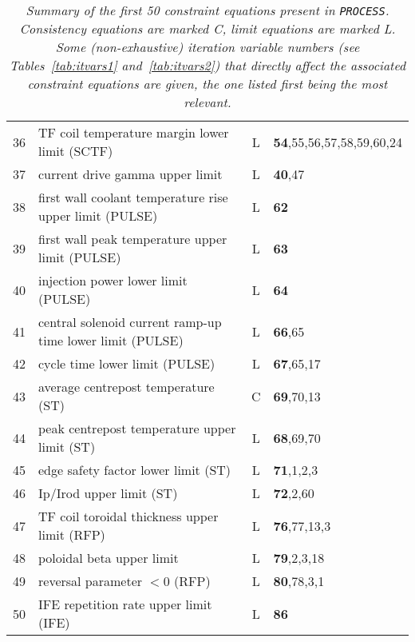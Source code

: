 \documentclass[11pt,a4paper]{report}
\newcommand{\process}{\mbox{\texttt{PROCESS}}}
\begin{document}
\begin{table}[tbph]
\begin{center}
\begin{tabular}{||c|l|c|l||}
36  & TF coil temperature margin lower limit (SCTF)             & L    & \textbf{54},55,56,57,58,59,60,24 \\
37  & current drive gamma upper limit                           & L    & \textbf{40},47 \\
38  & first wall coolant temperature rise upper limit (PULSE)   & L    & \textbf{62} \\
39  & first wall peak temperature upper limit (PULSE)           & L    & \textbf{63} \\
40  & injection power lower limit (PULSE)                       & L    & \textbf{64} \\
41  & central solenoid current ramp-up time lower limit (PULSE) & L    & \textbf{66},65 \\
42  & cycle time lower limit (PULSE)                            & L    & \textbf{67},65,17 \\
43  & average centrepost temperature (ST)                       & C    & \textbf{69},70,13 \\
44  & peak centrepost temperature upper limit (ST)              & L    & \textbf{68},69,70 \\
45  & edge safety factor lower limit    (ST)                    & L    & \textbf{71},1,2,3 \\
46  & Ip/Irod upper limit               (ST)                    & L    & \textbf{72},2,60 \\
47  & TF coil toroidal thickness upper limit (RFP)              & L    & \textbf{76},77,13,3 \\
48  & poloidal beta upper limit                                 & L    & \textbf{79},2,3,18 \\
49  & reversal parameter $< 0$ (RFP)                            & L    & \textbf{80},78,3,1 \\
50  & IFE repetition rate upper limit (IFE)                     & L    & \textbf{86} \\
\hline
\end{tabular}
\end{center}
\caption[List of constraint equations 1--50]
{\label{tab:eqns}
  \textit{Summary of the first 50 constraint equations present in \process. Consistency
    equations are marked C, limit equations are marked L\@. Some
    (non-exhaustive) iteration variable numbers (see Tables~\ref{tab:itvars1}
    and~\ref{tab:itvars2}) that directly affect the associated constraint
    equations are given, the one listed first being the most relevant.}
}
\normalsize
\end{table}
\end{document}
